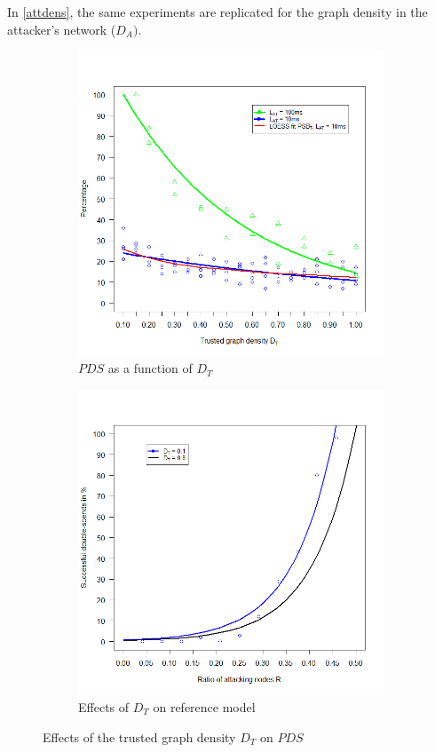 \documentclass[a4paper,12pt,twoside]{report}
\begin{document}
In \autoref{attdens}, the same experiments are replicated for the graph density in the attacker's network ($D_{A})$.
\begin{figure}
\centering
\begin{subfigure}{.5\textwidth}
  \centering
  \includegraphics[width=\linewidth]{Experiments/TruDensity/trudens.png}
  \caption{$PDS$ as a function of $D_{T}$}
  \label{trudens:a}
\end{subfigure}%
\begin{subfigure}{.5\textwidth}
  \centering
  \includegraphics[width=\linewidth]{Experiments/TruDensity/trudensrat.png}
  \caption{Effects of $D_{T}$ on reference model}
  \label{trudens:b}
\end{subfigure}
\caption{Effects of the trusted graph density $D_{T}$ on $PDS$}
\label{trudens}
\end{figure}
\end{document}
